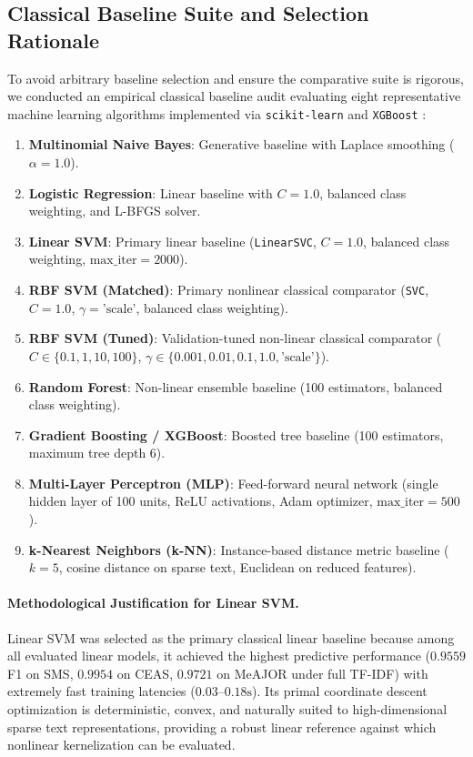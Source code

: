 \documentclass[10pt,twocolumn,letterpaper]{article}
\begin{document}
\subsection{Classical Baseline Suite and Selection Rationale}
To avoid arbitrary baseline selection and ensure the comparative suite is rigorous, we conducted an empirical classical baseline audit evaluating eight representative machine learning algorithms implemented via \texttt{scikit-learn} \cite{pedregosa2011scikit} and \texttt{XGBoost} \cite{chen2016xgboost}:
\begin{enumerate}
    \item \textbf{Multinomial Naive Bayes}: Generative baseline with Laplace smoothing ($\alpha = 1.0$).
    \item \textbf{Logistic Regression}: Linear baseline with $C = 1.0$, balanced class weighting, and L-BFGS solver.
    \item \textbf{Linear SVM}: Primary linear baseline (\texttt{LinearSVC}, $C = 1.0$, balanced class weighting, $\text{max\_iter} = 2000$).
    \item \textbf{RBF SVM (Matched)}: Primary nonlinear classical comparator (\texttt{SVC}, $C = 1.0$, $\gamma = \text{'scale'}$, balanced class weighting).
    \item \textbf{RBF SVM (Tuned)}: Validation-tuned non-linear classical comparator ($C \in \{0.1, 1, 10, 100\}$, $\gamma \in \{0.001, 0.01, 0.1, 1.0, \text{'scale'}\}$).
    \item \textbf{Random Forest}: Non-linear ensemble baseline (100 estimators, balanced class weighting).
    \item \textbf{Gradient Boosting / XGBoost}: Boosted tree baseline (100 estimators, maximum tree depth 6).
    \item \textbf{Multi-Layer Perceptron (MLP)}: Feed-forward neural network (single hidden layer of 100 units, ReLU activations, Adam optimizer, $\text{max\_iter} = 500$).
    \item \textbf{k-Nearest Neighbors (k-NN)}: Instance-based distance metric baseline ($k = 5$, cosine distance on sparse text, Euclidean on reduced features).
\end{enumerate}

\paragraph{Methodological Justification for Linear SVM.} Linear SVM was selected as the primary classical linear baseline because among all evaluated linear models, it achieved the highest predictive performance ($0.9559$ F1 on SMS, $0.9954$ on CEAS, $0.9721$ on MeAJOR under full TF-IDF) with extremely fast training latencies ($0.03\text{--}0.18\text{s}$). Its primal coordinate descent optimization is deterministic, convex, and naturally suited to high-dimensional sparse text representations, providing a robust linear reference against which nonlinear kernelization can be evaluated.
\end{document}
